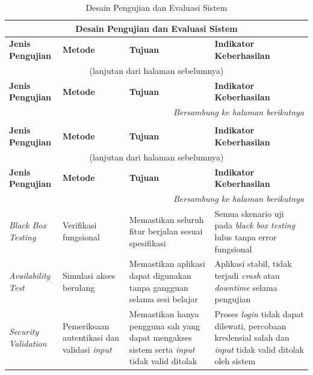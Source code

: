\begin{longtable}{|p{3.2cm}|p{2cm}|p{3.5cm}|p{3.5cm}|}
\caption{Desain Pengujian dan Evaluasi Sistem}
\label{tab:pengujian-evaluasi}\\
\hline
\multicolumn{4}{|c|}{\textbf{Desain Pengujian dan Evaluasi Sistem}} \\
\hline
\textbf{Jenis Pengujian} & \textbf{Metode} & \textbf{Tujuan} & \textbf{Indikator Keberhasilan} \\
\hline
\endfirsthead

\multicolumn{4}{c}{\small (lanjutan dari halaman sebelumnya)}\\[0.3em]
\hline
\textbf{Jenis Pengujian} & \textbf{Metode} & \textbf{Tujuan} & \textbf{Indikator Keberhasilan} \\
\hline
\endhead

\hline
\multicolumn{4}{r}{\textit{Bersambung ke halaman berikutnya}}\\
\endfoot

\hline
\endlastfoot
\caption{Desain Pengujian dan Evaluasi Sistem}
\label{tab:pengujian-evaluasi}\\

\hline
\textbf{Jenis Pengujian} & \textbf{Metode} & \textbf{Tujuan} & \textbf{Indikator Keberhasilan} \\
\hline
\endfirsthead

\multicolumn{4}{c}{\small (lanjutan dari halaman sebelumnya)}\\[0.3em]
\hline
\textbf{Jenis Pengujian} & \textbf{Metode} & \textbf{Tujuan} & \textbf{Indikator Keberhasilan} \\
\hline
\endhead

\hline
\multicolumn{4}{r}{\textit{Bersambung ke halaman berikutnya}}\\
\endfoot

\hline
\endlastfoot

\textit{Black Box Testing} &
Verifikasi fungsional &
Memastikan seluruh fitur berjalan sesuai spesifikasi &
Semua skenario uji pada \textit{black box testing} lulus tanpa error fungsional \\
\hline

\textit{Availability Test} &
Simulasi akses berulang &
Memastikan aplikasi dapat digunakan tanpa gangguan selama sesi belajar &
Aplikasi stabil, tidak terjadi \textit{crash} atau \textit{downtime} selama pengujian \\
\hline

\textit{Security Validation} &
Pemeriksaan autentikasi dan validasi \textit{input} &
Memastikan hanya pengguna sah yang dapat mengakses sistem serta \textit{input} tidak valid ditolak &
Proses \textit{login} tidak dapat dilewati, percobaan kredensial salah dan \textit{input} tidak valid ditolak oleh sistem \\
\hline


\end{longtable}
